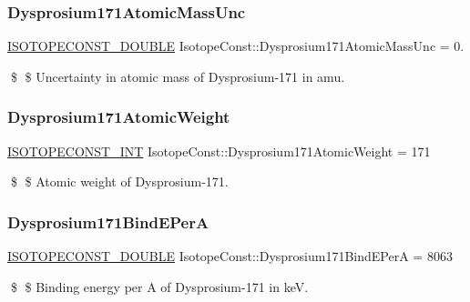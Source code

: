 \subsubsection{\texorpdfstring{Dysprosium171\+Atomic\+Mass\+Unc}{Dysprosium171AtomicMassUnc}}
{\footnotesize\ttfamily \mbox{\hyperlink{group___isotope_const-_macros_ga8f45a7272ce02c0b4c65c44636ed719a}{I\+S\+O\+T\+O\+P\+E\+C\+O\+N\+S\+T\+\_\+\+D\+O\+U\+B\+LE}} Isotope\+Const\+::\+Dysprosium171\+Atomic\+Mass\+Unc = 0.}

\$ \$ Uncertainty in atomic mass of Dysprosium-\/171 in amu. \mbox{\label{group___isotope_const-_dysprosium-_dy171_gae7ba9962b1e9279fb837cdad62a54343}} 
\subsubsection{\texorpdfstring{Dysprosium171\+Atomic\+Weight}{Dysprosium171AtomicWeight}}
{\footnotesize\ttfamily \mbox{\hyperlink{group___isotope_const-_macros_ga5f18360b3e99483a35c32d789e62621c}{I\+S\+O\+T\+O\+P\+E\+C\+O\+N\+S\+T\+\_\+\+I\+NT}} Isotope\+Const\+::\+Dysprosium171\+Atomic\+Weight = 171}

\$ \$ Atomic weight of Dysprosium-\/171. \mbox{\label{group___isotope_const-_dysprosium-_dy171_ga767b9abab56f034486c348a0d5339b23}} 
\subsubsection{\texorpdfstring{Dysprosium171\+Bind\+E\+PerA}{Dysprosium171BindEPerA}}
{\footnotesize\ttfamily \mbox{\hyperlink{group___isotope_const-_macros_ga8f45a7272ce02c0b4c65c44636ed719a}{I\+S\+O\+T\+O\+P\+E\+C\+O\+N\+S\+T\+\_\+\+D\+O\+U\+B\+LE}} Isotope\+Const\+::\+Dysprosium171\+Bind\+E\+PerA = 8063}

\$ \$ Binding energy per A of Dysprosium-\/171 in keV. \mbox{\label{group___isotope_const-_dysprosium-_dy171_ga0147dfbffca56d23539be454b1a2ec6a}} 
